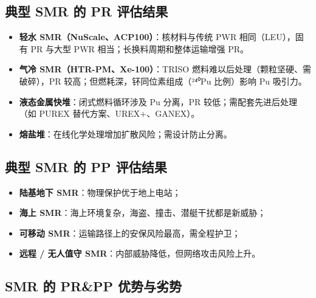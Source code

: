 \documentclass[
  UTF8,
  scheme=plain,
  fontsize=10pt,
  openany
]{ctexbook}
\begin{document}
\subsection{典型 SMR 的 PR
评估结果}\label{ux5178ux578b-smr-ux7684-pr-ux8bc4ux4f30ux7ed3ux679c}

\begin{itemize}
\tightlist
\item
  \textbf{轻水 SMR（NuScale、ACP100）}：核材料与传统 PWR
  相同（LEU），固有 PR 与大型 PWR 相当；长换料周期和整体运输增强 PR。
\item
  \textbf{气冷 SMR（HTR-PM、Xe-100）}：TRISO
  燃料难以后处理（颗粒坚硬、需破碎），PR
  较高；但燃耗深，钚同位素组成（²⁴⁰Pu 比例）影响 Pu 吸引力。
\item
  \textbf{液态金属快堆}：闭式燃料循环涉及 Pu 分离，PR
  较低；需配套先进后处理（如 PUREX 替代方案、UREX+、GANEX）。
\item
  \textbf{熔盐堆}：在线化学处理增加扩散风险；需设计防止分离。
\end{itemize}

\subsection{典型 SMR 的 PP
评估结果}\label{ux5178ux578b-smr-ux7684-pp-ux8bc4ux4f30ux7ed3ux679c}

\begin{itemize}
\tightlist
\item
  \textbf{陆基地下 SMR}：物理保护优于地上电站；
\item
  \textbf{海上 SMR}：海上环境复杂，海盗、撞击、潜艇干扰都是新威胁；
\item
  \textbf{可移动 SMR}：运输路径上的安保风险最高，需全程护卫；
\item
  \textbf{远程 / 无人值守 SMR}：内部威胁降低，但网络攻击风险上升。
\end{itemize}

\subsection{SMR 的 PR\&PP
优势与劣势}\label{smr-ux7684-prpp-ux4f18ux52bfux4e0eux52a3ux52bf}
\end{document}
